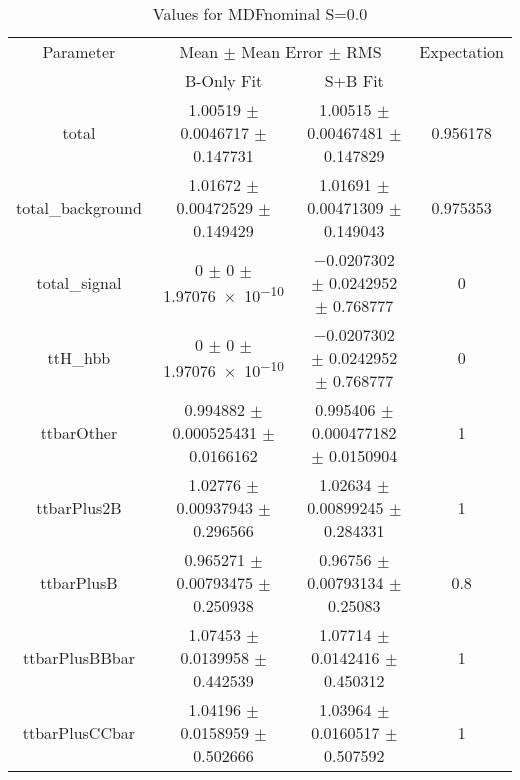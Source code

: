 \begin{table}
\centering
\caption{Values for MDFnominal S=0.0}
\begin{tabular}{cccc}
\toprule
Parameter & \multicolumn{2}{c}{Mean $\pm$ Mean Error $\pm$ RMS} & Expectation\\
 & B-Only Fit & S+B Fit & \\
\midrule
total & \num{1.00519} $\pm$ \num{0.0046717} $\pm$ \num{0.147731} & \num{1.00515} $\pm$ \num{0.00467481} $\pm$ \num{0.147829} & \num{0.956178}\\
total\_background & \num{1.01672} $\pm$ \num{0.00472529} $\pm$ \num{0.149429} & \num{1.01691} $\pm$ \num{0.00471309} $\pm$ \num{0.149043} & \num{0.975353}\\
total\_signal & \num{0} $\pm$ \num{0} $\pm$ \num{1.97076e-10} & \num{-0.0207302} $\pm$ \num{0.0242952} $\pm$ \num{0.768777} & \num{0}\\
ttH\_hbb & \num{0} $\pm$ \num{0} $\pm$ \num{1.97076e-10} & \num{-0.0207302} $\pm$ \num{0.0242952} $\pm$ \num{0.768777} & \num{0}\\
ttbarOther & \num{0.994882} $\pm$ \num{0.000525431} $\pm$ \num{0.0166162} & \num{0.995406} $\pm$ \num{0.000477182} $\pm$ \num{0.0150904} & \num{1}\\
ttbarPlus2B & \num{1.02776} $\pm$ \num{0.00937943} $\pm$ \num{0.296566} & \num{1.02634} $\pm$ \num{0.00899245} $\pm$ \num{0.284331} & \num{1}\\
ttbarPlusB & \num{0.965271} $\pm$ \num{0.00793475} $\pm$ \num{0.250938} & \num{0.96756} $\pm$ \num{0.00793134} $\pm$ \num{0.25083} & \num{0.8}\\
ttbarPlusBBbar & \num{1.07453} $\pm$ \num{0.0139958} $\pm$ \num{0.442539} & \num{1.07714} $\pm$ \num{0.0142416} $\pm$ \num{0.450312} & \num{1}\\
ttbarPlusCCbar & \num{1.04196} $\pm$ \num{0.0158959} $\pm$ \num{0.502666} & \num{1.03964} $\pm$ \num{0.0160517} $\pm$ \num{0.507592} & \num{1}\\
\bottomrule
\end{tabular}
\end{table}